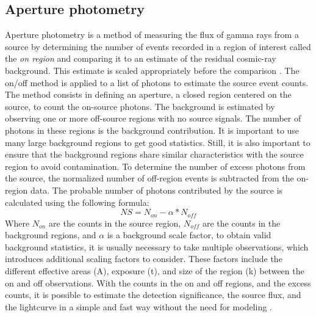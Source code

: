 \subsection{Aperture photometry}
\label{ss:aperture-photometry}
Aperture photometry is a method of measuring the flux of gamma rays from a source by determining the number of events recorded in a region of interest called the \textit{on region} and comparing it to an estimate of the residual cosmic-ray background. This estimate is scaled appropriately before the comparison \cite{mohrmann2019}. The on/off method is applied to a list of photons to estimate the source event counts. The method consists in defining an aperture, a closed region centered on the source, to count the on-source photons. The background is estimated by observing one or more off-source regions with no source signals. The number of photons in these regions is the background contribution. It is important to use many large background regions to get good statistics. Still, it is also important to ensure that the background regions share similar characteristics with the source region to avoid contamination. To determine the number of excess photons from the source, the normalized number of off-region events is subtracted from the on-region data. The probable number of photons contributed by the source is calculated using the following formula:
$$NS = N_{on} - \alpha*N_{off}$$
Where $N_{on}$ are the counts in the source region, $N_{off}$ are the counts in the background regions, and $\alpha$ is a background scale factor, to obtain valid background statistics, it is usually necessary to take multiple observations, which introduces additional scaling factors to consider. These factors include the different effective areas (A), exposure (t), and size of the region (k) between the on and off observations. With the counts in the on and off regions, and the excess counts, it is possible to estimate the detection significance, the source flux, and the lightcurve in a simple and fast way without the need for modeling \cite{tampieri2020real}.

